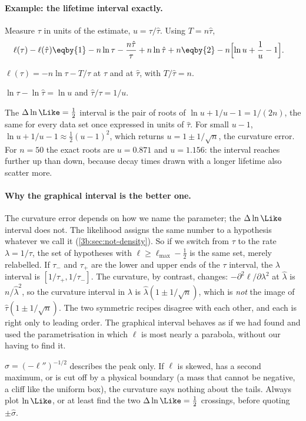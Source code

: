 \paragraph{Example: the lifetime interval exactly.}
Measure $\tau$ in units of the estimate, $u=\tau/\hat\tau$. Using
$T=n\hat\tau$,
\begin{align*}
  \ell(\tau)-\ell(\hat\tau)
  &\eqby{1}-n\ln\tau-\frac{n\hat\tau}{\tau}+n\ln\hat\tau+n
  \eqby{2}-n\Bigl[\ln u+\frac1u-1\Bigr].
\end{align*}
\begin{explain}
  \item $\ell(\tau)=-n\ln\tau-T/\tau$ at $\tau$ and at $\hat\tau$, with
        $T/\hat\tau=n$.
  \item $\ln\tau-\ln\hat\tau=\ln u$ and $\hat\tau/\tau=1/u$.
\end{explain}
The $\Delta\ln\Like=\tfrac12$ interval is the pair of roots of
$\ln u+1/u-1=1/(2n)$, the same for every data set once expressed in units of
$\hat\tau$. For small $u-1$, $\ln u+1/u-1\approx\tfrac12(u-1)^2$, which
returns $u=1\pm1/\sqrt n$, the curvature error. For $n=50$ the exact roots
are $u=0.871$ and $u=1.156$: the interval reaches further up than down,
because decay times drawn with a longer lifetime also scatter more.

\paragraph{Why the graphical interval is the better one.}
The curvature error depends on how we name the parameter; the $\Delta\ln\Like$
interval does not. The likelihood assigns the same number to a hypothesis
whatever we call it (\cref{3b:sec:not-density}). So if we switch from $\tau$
to the rate $\lambda=1/\tau$, the set of hypotheses with
$\ell\ge\ell_{\max}-\tfrac12$ is the same set, merely relabelled. If
$\tau_-$ and $\tau_+$ are the lower and upper ends of the $\tau$ interval,
the $\lambda$ interval is $[1/\tau_+,1/\tau_-]$. The curvature, by contrast,
changes: $-\partial^2\ell/\partial\lambda^2$ at $\hat\lambda$ is $n/\hat\lambda^2$,
so the curvature interval in $\lambda$ is $\hat\lambda(1\pm1/\sqrt n)$,
which is \emph{not} the image of $\hat\tau(1\pm1/\sqrt n)$. The two
symmetric recipes disagree with each other, and each is right only to
leading order. The graphical interval behaves as if we had found and used
the parametrisation in which $\ell$ is most nearly a parabola, without our
having to find it.

\begin{pitfall}
$\hat\sigma=(-\ell'')^{-1/2}$ describes the peak only. If $\ell$ is skewed,
has a second maximum, or is cut off by a physical boundary (a mass that
cannot be negative, a cliff like the uniform box), the curvature says
nothing about the tails. Always plot $\ln\Like$, or at least find the two
$\Delta\ln\Like=\tfrac12$ crossings, before quoting $\pm\hat\sigma$.
\end{pitfall}

